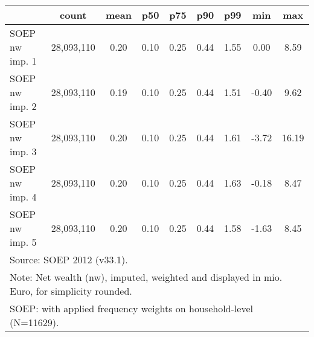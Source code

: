 {
\def\sym#1{\ifmmode^{#1}\else\(^{#1}\)\fi}
\begin{tabular}{l*{1}{cccccccc}}
\hline\hline
                                            &       count&        mean&         p50&         p75&         p90&         p99&         min&         max\\
\hline
SOEP nw imp. 1                              &  28,093,110&        0.20&        0.10&        0.25&        0.44&        1.55&        0.00&        8.59\\
SOEP nw imp. 2                              &  28,093,110&        0.19&        0.10&        0.25&        0.44&        1.51&       -0.40&        9.62\\
SOEP nw imp. 3                              &  28,093,110&        0.20&        0.10&        0.25&        0.44&        1.61&       -3.72&       16.19\\
SOEP nw imp. 4                              &  28,093,110&        0.20&        0.10&        0.25&        0.44&        1.63&       -0.18&        8.47\\
SOEP nw imp. 5                              &  28,093,110&        0.20&        0.10&        0.25&        0.44&        1.58&       -1.63&        8.45\\
\hline\hline
\multicolumn{9}{l}{\footnotesize Source: SOEP 2012 (v33.1).}\\
\multicolumn{9}{l}{\footnotesize Note: Net wealth (nw), imputed, weighted and displayed in mio. Euro, for simplicity rounded.}\\
\multicolumn{9}{l}{\footnotesize SOEP: with applied frequency weights on household-level (N=11629).}\\
\end{tabular}
}
